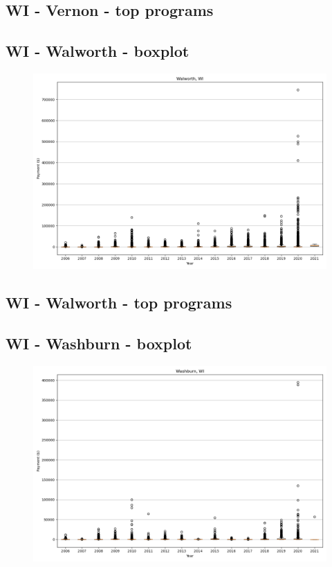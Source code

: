 \subsection*{WI - Vernon - top programs}

\newpage
\subsection*{WI - Walworth - boxplot}
\begin{figure}[h]
\centering
\includegraphics[width=7in]{../output/boxplots/counties/Walworth-WI_boxplot.png}
\end{figure}


\subsection*{WI - Walworth - top programs}

\newpage
\subsection*{WI - Washburn - boxplot}
\begin{figure}[h]
\centering
\includegraphics[width=7in]{../output/boxplots/counties/Washburn-WI_boxplot.png}
\end{figure}


